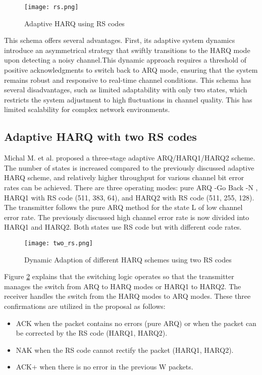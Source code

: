 \documentclass[sn-mathphys-num]{sn-jnl}
\theoremstyle{thmstyleone}
\theoremstyle{thmstyletwo}%
\theoremstyle{thmstylethree}%
\begin{document}
\begin{figure}[H]
    \centering
    \texttt{[image: rs.png]}
    \caption{Adaptive HARQ using RS codes \cite{r6}}
    \label{fig:2}
\end{figure}

This schema offers several advantages. First, its adaptive system dynamics introduce an asymmetrical strategy that swiftly transitions to the HARQ mode upon detecting a noisy channel.This dynamic approach requires a threshold of positive acknowledgments to switch back to ARQ mode, ensuring that the system remains robust and responsive to real-time channel conditions. This schema has several disadvantages, such as limited adaptability with only two states, which restricts the system adjustment to high fluctuations in channel quality. This has limited scalability for complex network environments.

\subsection{Adaptive HARQ with two RS codes} \label{s2.2}

Michal M. et al. \cite{r8} proposed a three-stage adaptive ARQ/HARQ1/HARQ2 scheme. The number of states is increased compared to the previously discussed adaptive HARQ scheme, and relatively higher throughput for various channel bit error rates can be achieved. There are three operating modes: pure ARQ -Go Back -N \cite{r18}, HARQ1 with RS code (511, 383, 64), and HARQ2 with RS code (511, 255, 128). The transmitter follows the pure ARQ method for the state L of low channel error rate. The previously discussed high channel error rate is now divided into HARQ1 and HARQ2. Both states use RS code but with different code rates. 

\begin{figure}[H]
    \centering
    \texttt{[image: two\_rs.png]}
    \caption{Dynamic Adaption of different HARQ schemes using two RS codes \cite{r8}}
    \label{fig:3}
\end{figure}

Figure \ref{fig:3} explains that the switching logic operates so that the transmitter manages the switch from ARQ to HARQ modes or HARQ1 to HARQ2. The receiver handles the switch from the HARQ modes to ARQ modes. These three confirmations are utilized in the proposal \cite{r8} as follows:
   \begin{itemize}
       \item ACK when the packet contains no errors (pure ARQ) or when the packet can be corrected by the RS code (HARQ1, HARQ2).
       \item NAK when the RS code cannot rectify the packet (HARQ1, HARQ2).
       \item  ACK+ when there is no error in the previous W packets.
   \end{itemize}
\end{document}
